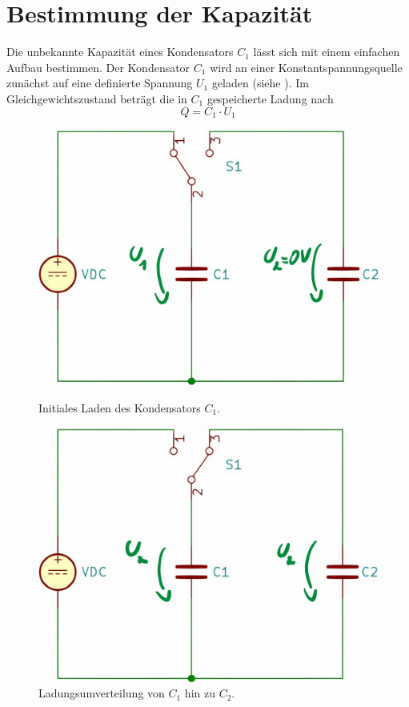 \section{Bestimmung der Kapazität}
%
Die unbekannte Kapazität eines Kondensators \(C_1\) lässt sich mit einem einfachen Aufbau bestimmen. Der Kondensator
\(C_1\) wird an einer Konstantspannungsquelle zunächst auf eine definierte Spannung \(U_1\) geladen (siehe ).
Im Gleichgewichtszustand beträgt die in \(C_1\) gespeicherte Ladung nach 
\begin{equation}
    Q = C_1 \cdot U_1
    \label{eq:ladungc1}
\end{equation}
\begin{figure}[h]
    \centering
    \begin{minipage}[b]{.45\linewidth}
        \includegraphics[width=.95\linewidth]{kicad/abbildungen/c1laden_annot.jpg}
        \caption[]{Initiales Laden des Kondensators \(C_1\).}
        \label{fig:c1laden}
    \end{minipage}
    \begin{minipage}[b]{.45\linewidth}
        \includegraphics[width=.95\linewidth]{kicad/abbildungen/c1entladen_annot.jpg}
        \caption[]{Ladungsumverteilung von \(C_1\) hin zu \(C_2\).}
        \label{fig:c1entladen}
    \end{minipage}
\end{figure}
